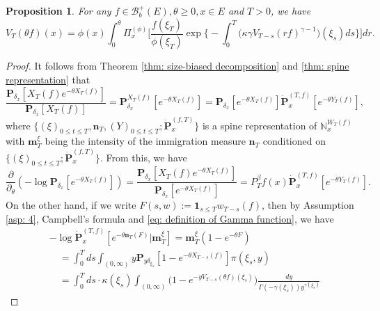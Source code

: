 \documentclass[12pt, a4paper]{amsart}
\newtheorem{prop}[thm]{Proposition}
\theoremstyle{definition}
\numberwithin{equation}{section}
\begin{document}
\begin{prop}
	For any $f\in \mathscr B^+_b(E),\theta \geq 0,x\in E$ and $T>0$, we have
\begin{equation}\label{eq: equation for Vt(theta f) for theta}
	V_T ( \theta f) ( x)
	= \phi( x) \int_0^\theta \Pi_x^{(\phi)} \Big[ \frac{ f(\xi_T) } { \phi(\xi_T) } \exp\Big\{ - \int_0^T \big( \kappa \gamma V_{T-s} (r f)^{ \gamma - 1} \big) ( \xi_s) ds\Big\} \Big] dr.
\end{equation}
\end{prop}

\begin{proof}
	It follows from Theorem \ref{thm: size-biased decomposition} and \ref{thm: spine representation} that
\begin{equation}
	\frac{ \mathbf P_{\delta_x}[X_T(f)e^{-\theta X_T(f)}] } {  \mathbf P_{\delta_x} [X_T(f)] }
	= \mathbf P_{\delta_x}^{X_T(f)} [e^{-\theta X_T(f)}]
	= \mathbf P_{\delta_x} [e^{-\theta X_T(f)}] \dot {\mathbf P}_x^{(T,f)}[e^{-\theta Y_T(f)}],
\end{equation}
	where $\{(\xi)_{0\le t\le T}, \mathbf n_T, (Y)_{0\le t\le T}; \dot {\mathbf P}^{(f,T)}_x\}$ is a spine representation of $\mathbb N^{W_T(f)}_x$ with $\mathbf m^\xi_T$ being the intensity of the immigration measure $\mathbf n_T$ conditioned on $\{(\xi)_{0\le t\le T}; \dot {\mathbf P}^{(f,T)}_x\}$.
	From this, we have
\begin{equation} \label{eq: dynamic of theta on v_t theta reason 1}
	\frac{\partial}{\partial_\theta}
	(-\log \mathbf P_{\delta_x}[e^{-\theta X_T(f)}])
	= \frac{\mathbf P_{\delta_x}[X_T(f)e^{-\theta X_T(f)}]}{\mathbf P_{\delta_x}[e^{-\theta X_T(f)}]}
	= P^\beta_T f(x) \dot {\mathbf P}_x^{(T,f)}[e^{-\theta Y_T(f)}].
\end{equation}
	On the other hand, if we write $F(s,w):= \mathbf 1_{s\leq T} w_{T-s}(f)$, then by Assumption \ref{asp: 4}, Campbell's formula and \eqref{eq: definition of Gamma function}, we have
\begin{equation}\label{eq: dynamic of theta on v_t theta reason 2}\begin{split}
	&-\log \dot {\mathbf P}^{(T,f)}_{x}[e^{-\theta \mathbf n_T(F)}|\mathbf m_T^\xi]
	= \mathbf m_T^\xi(1-e^{-\theta F})
	\\&\quad = \int_0^T ds \int_{(0,\infty)} y \mathbf P_{y\delta_{\xi_s}}[1- e^{-\theta X_{T-s}(f)}] \pi(\xi_s,y)
	\\&\quad = \int_0^T ds \cdot \kappa(\xi_s) \int_{(0,\infty)} \mathbf (1- e^{- y V_{T-s}(\theta f)(\xi_s)}) \frac{dy}{\Gamma(-\gamma(\xi_s)) y^{\gamma(\xi_s)}}

\end{split}
\end{equation}
\end{proof}
\end{document}

